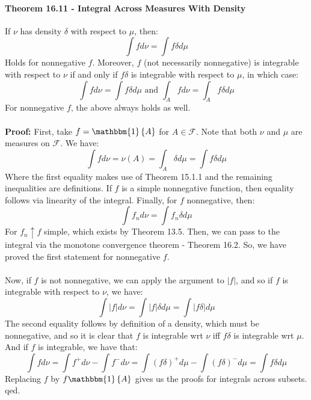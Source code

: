 \documentclass[12pt,a4paper]{article}
\newcommand{\1}[1]{\mathbbm{1}\left\{ #1 \right\}}
\newcommand{\fcal}{\mathcal{F}}
\begin{document}
\paragraph{Theorem 16.11 - Integral Across Measures With Density} If $\nu$ has density $\delta$ with respect to $\mu$, then:
$$
	\int f d\nu = \int f\delta d\mu
$$
Holds for nonnegative $f$. Moreover, $f$ (not necessarily nonnegative) is integrable with respect to $\nu$ if and only if $f\delta$ is integrable with respect to $\mu$, in which case:
$$
	\int f d\nu = \int f\delta d\mu \text{ and }
	\int_A f d\nu = \int_A f\delta d\mu
$$
For nonnegative $f$, the above always holds as well.
\\\\
\textbf{Proof:} First, take $f = \1{A}$ for $A \in \fcal$. Note that both $\nu$ and $\mu$ are measures on $\fcal$. We have:
$$
	\int f d\nu = \nu(A) = \int_A \delta d\mu = \int f\delta d\mu
$$
Where the first equality makes use of Theorem 15.1.1 and the remaining inequalities are definitions. If $f$ is a simple nonnegative function, then equality follows via linearity of the integral. Finally, for $f$ nonnegative, then:
$$
	\int f_n d\nu = \int f_n\delta d\mu
$$
For $f_n \uparrow f$ simple, which exists by Theorem 13.5. Then, we can pass to the integral via the monotone convergence theorem - Theorem 16.2. So, we have proved the first statement for nonnegative $f$.
\\\\
Now, if $f$ is not nonnegative, we can apply the argument to $|f|$, and so if $f$ is integrable with respect to $\nu$, we have:
$$
	\int |f| d\nu = \int |f|\delta d\mu = \int |f\delta| d\mu
$$
The second equality follows by definition of a density, which must be nonnegative, and so it is clear that $f$ is integrable wrt $\nu$ iff $f\delta$ is integrable wrt $\mu$. And if $f$ is integrable, we have that:
$$
	\int f d\nu = \int f^+ d\nu - \int f^- d\nu = 
	\int (f\delta)^+ d\mu - \int (f\delta)^- d\mu = \int f\delta d\mu
$$
Replacing $f$ by $f\1{A}$ gives us the proofs for integrals across subsets. qed.
\end{document}
